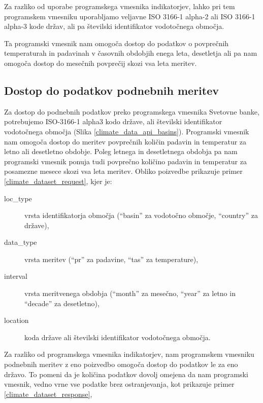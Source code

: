 Za razliko od uporabe programskega vmesnika indikatorjev, lahko pri tem
programskem vmesniku uporabljamo veljavne ISO 3166-1 alpha-2 ali ISO 3166-1 
alpha-3 kode držav, ali pa številski identifikator vodotočnega 
območja.

Ta programski vmesnik nam omogoča dostop do podatkov o povprečnih 
temperaturah in padavinah v časovnih obdobjih enega leta, desetletja ali pa 
nam omogoča dostop do mesečnih povprečij skozi vsa leta meritev.


\subsection{Dostop do podatkov podnebnih meritev}

Za dostop do podnebnih podatkov preko programskega vmesnika Svetovne banke,
potrebujemo ISO-3166-1 alpha3 kodo države, ali številski identifikator
vodotočnega območja (Slika \ref{climate_data_api_basins}). Programski vmesnik
nam omogoča dostop do meritev povprečnih količin padavin in temperatur za 
letno ali desetletno obdobje. Poleg letnega in desetletnega obdobja pa nam 
programski vmesnik ponuja tudi povprečno količino padavin in temperatur za 
posamezne mesece skozi vsa leta meritev. Obliko poizvedbe prikazuje primer 
\ref{climate_dataset_request}, kjer je:
\begin{description}
\item [loc\_type] vrsta identifikatorja območja (``basin'' za vodotočno območje, 
  ``country'' za države),
\item [data\_type] vrsta meritev (``pr'' za padavine, ``tas'' za temperature),
\item [interval] vrsta meritvenega obdobja (``month'' za mesečno, ``year'' za letno in
  ``decade'' za desetletno),
\item [location] koda države ali številski identifikator vodotočnega območja.
\end{description}
Za razliko od programskega vmesnika indikatorjev, nam programskem vmesniku
podnebnih meritev z eno poizvedbo omogoča dostop do podatkov le za eno državo.
To pomeni da je količina podatkov dovolj omejena da nam programski vmesnik,
vedno vrne vse podatke brez ostranjevanja, kot prikazuje primer 
\ref{climate_dataset_response},


